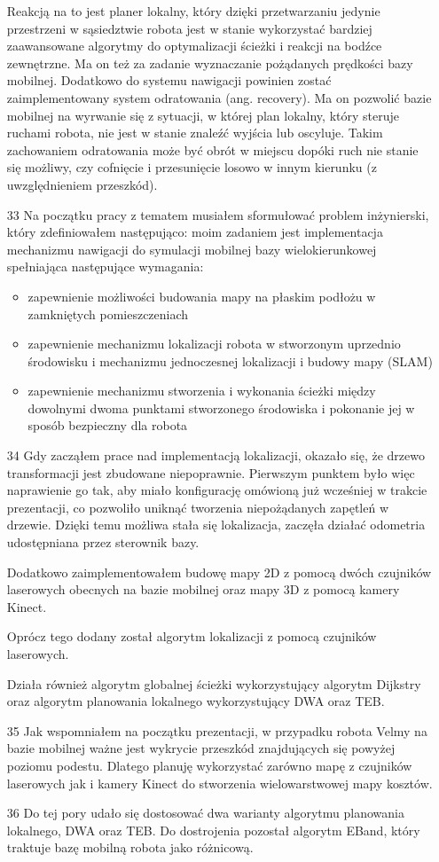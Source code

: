 \documentclass[20pt,a4paper]{article}
\begin{document}
\begin{itemize}
Reakcją na to jest planer lokalny, który dzięki przetwarzaniu jedynie przestrzeni w sąsiedztwie robota jest w stanie wykorzystać bardziej zaawansowane algorytmy do optymalizacji ścieżki i reakcji na bodźce zewnętrzne. 
Ma on też za zadanie wyznaczanie pożądanych prędkości bazy mobilnej.
Dodatkowo do systemu nawigacji powinien zostać zaimplementowany system odratowania (ang. recovery). 
Ma on pozwolić bazie mobilnej na wyrwanie się z sytuacji, w której plan lokalny, który steruje ruchami robota, nie jest w stanie znaleźć wyjścia lub oscyluje.
Takim zachowaniem odratowania może być obrót w miejscu dopóki ruch nie stanie się możliwy, czy cofnięcie i przesunięcie losowo w innym kierunku (z uwzględnieniem przeszkód).
		\item[33]
		Na początku pracy z tematem musiałem sformułować problem inżynierski, który zdefiniowałem następująco:
moim zadaniem jest implementacja mechanizmu nawigacji do symulacji mobilnej bazy wielokierunkowej spełniająca następujące wymagania:
		\begin{itemize}
			\item
			zapewnienie możliwości budowania mapy na płaskim podłożu w zamkniętych pomieszczeniach
			\item
			zapewnienie mechanizmu lokalizacji robota w stworzonym uprzednio środowisku i mechanizmu jednoczesnej lokalizacji i budowy mapy (SLAM)
			\item
			zapewnienie mechanizmu stworzenia i wykonania ścieżki między dowolnymi dwoma punktami stworzonego środowiska i pokonanie jej w sposób bezpieczny dla robota
		\end{itemize}
 		\item[34]
 		Gdy zacząłem prace nad implementacją lokalizacji, okazało się, że drzewo transformacji jest zbudowane niepoprawnie. 
Pierwszym punktem było więc naprawienie go tak, aby miało konfigurację omówioną już wcześniej w trakcie prezentacji, co pozwoliło uniknąć tworzenia niepożądanych zapętleń w drzewie.
Dzięki temu możliwa stała się lokalizacja, zaczęła działać odometria udostępniana przez sterownik bazy.

Dodatkowo zaimplementowałem budowę mapy 2D z pomocą dwóch czujników laserowych obecnych na bazie mobilnej oraz mapy 3D z pomocą kamery Kinect.

Oprócz tego dodany został algorytm lokalizacji z pomocą czujników laserowych.

Działa również algorytm  globalnej ścieżki wykorzystujący algorytm Dijkstry oraz algorytm planowania lokalnego wykorzystujący DWA oraz TEB.
		\item[35]
		Jak wspomniałem na początku prezentacji, w przypadku robota Velmy na bazie mobilnej ważne jest wykrycie przeszkód znajdujących się powyżej poziomu podestu.
Dlatego planuję wykorzystać zarówno mapę z czujników laserowych jak i kamery Kinect do stworzenia wielowarstwowej mapy kosztów. 
		\item[36]
		Do tej pory udało się dostosować dwa warianty algorytmu planowania lokalnego, DWA oraz TEB.
		Do dostrojenia pozostał algorytm EBand, który traktuje bazę mobilną robota jako różnicową.
		

\end{itemize}
\end{document}
